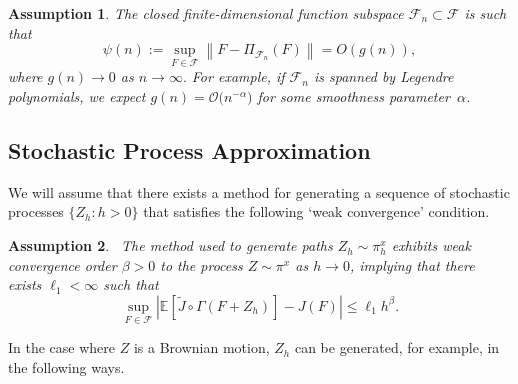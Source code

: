 \documentclass[11pt,leqno]{amsart}
\newtheorem{assumption}{Assumption}
\begin{document}
\begin{assumption}\label{ass:distsubspace}
    The closed finite-dimensional function subspace $\mathcal F_n \subset \mathcal{F}$ is such that 
    \begin{equation} \label{ass:findimconv} \psi(n) := \sup_{F \in \mathcal{F}} \left\| F - \Pi_{\mathcal{F}_n}(F) \right\| = O(g(n)),
    \end{equation} 
where $g(n) \to 0$ as $n \to \infty.$ For example, if $\mathcal{F}_n$ is spanned by Legendre polynomials, we expect
$g(n) = \mathcal{O}\bigl(n^{-\alpha}\bigr)$ for some smoothness parameter~$\alpha$. 
\end{assumption}


\subsection{Stochastic Process Approximation}
We will assume that there exists a method for generating a sequence of stochastic processes $\{Z_h : h > 0\}$ that satisfies the following `weak convergence' condition.

\begin{assumption}~\label{ass:weak-order}
	The method used to generate paths $Z_{h} {\sim} \pi^{x}_{h}$ exhibits weak convergence order $\beta > 0$ to the process $Z\sim \pi^x$ as $h \to 0$, implying that there exists $\ell_1<\infty$ such that \begin{equation}\label{discbd}\sup_{F \in \mathcal{F}} \left|\mathbb{E}\left[\tilde{J}\circ\Gamma(F+Z_h)\right] - J(F)\right| \leq \ell_1 h^\beta.\end{equation} 
\end{assumption}

 In the case where $Z$ is a Brownian motion, $Z_h$ can be generated, for example, in the following ways.
\end{document}

